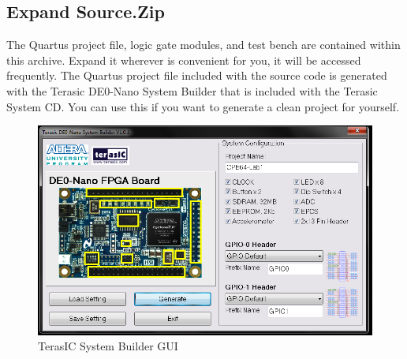 \documentclass[12pt,journal]{IEEEtran}
\begin{document}
    \subsection{\bfseries Expand Source.Zip}
    The Quartus project file, logic gate modules, and test bench are contained within this archive. 
    Expand it wherever is convenient for you, it will be accessed frequently. The Quartus project file
    included with the source code is generated with the Terasic DE0-Nano System Builder that is included
    with the Terasic System CD. You can use this if you want to generate a clean project for yourself.
    \begin{figure}[H]
      \includegraphics[width=.48\textwidth]{Images/screenshot_88.jpg}
      \caption{TerasIC System Builder GUI}
    \end{figure}
    
\end{document}
